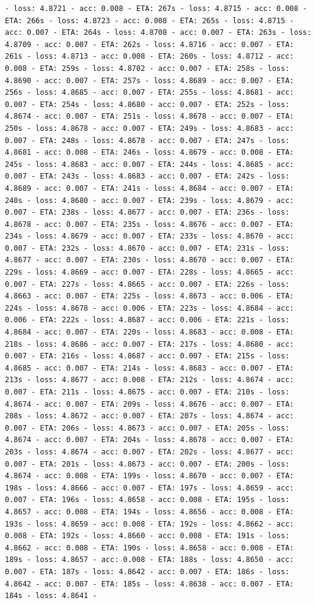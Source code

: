\documentclass[11pt]{article}
\begin{document}
\begin{Verbatim}[commandchars=\\\{\}]
- loss: 4.8721 - acc: 0.008 - ETA: 267s - loss: 4.8715 - acc: 0.008 - ETA: 266s - loss: 4.8723 - acc: 0.008 - ETA: 265s - loss: 4.8715 - acc: 0.007 - ETA: 264s - loss: 4.8708 - acc: 0.007 - ETA: 263s - loss: 4.8709 - acc: 0.007 - ETA: 262s - loss: 4.8716 - acc: 0.007 - ETA: 261s - loss: 4.8713 - acc: 0.008 - ETA: 260s - loss: 4.8712 - acc: 0.008 - ETA: 259s - loss: 4.8702 - acc: 0.007 - ETA: 258s - loss: 4.8690 - acc: 0.007 - ETA: 257s - loss: 4.8689 - acc: 0.007 - ETA: 256s - loss: 4.8685 - acc: 0.007 - ETA: 255s - loss: 4.8681 - acc: 0.007 - ETA: 254s - loss: 4.8680 - acc: 0.007 - ETA: 252s - loss: 4.8674 - acc: 0.007 - ETA: 251s - loss: 4.8678 - acc: 0.007 - ETA: 250s - loss: 4.8678 - acc: 0.007 - ETA: 249s - loss: 4.8683 - acc: 0.007 - ETA: 248s - loss: 4.8678 - acc: 0.007 - ETA: 247s - loss: 4.8681 - acc: 0.008 - ETA: 246s - loss: 4.8679 - acc: 0.008 - ETA: 245s - loss: 4.8683 - acc: 0.007 - ETA: 244s - loss: 4.8685 - acc: 0.007 - ETA: 243s - loss: 4.8683 - acc: 0.007 - ETA: 242s - loss: 4.8689 - acc: 0.007 - ETA: 241s - loss: 4.8684 - acc: 0.007 - ETA: 240s - loss: 4.8680 - acc: 0.007 - ETA: 239s - loss: 4.8679 - acc: 0.007 - ETA: 238s - loss: 4.8677 - acc: 0.007 - ETA: 236s - loss: 4.8678 - acc: 0.007 - ETA: 235s - loss: 4.8676 - acc: 0.007 - ETA: 234s - loss: 4.8679 - acc: 0.007 - ETA: 233s - loss: 4.8670 - acc: 0.007 - ETA: 232s - loss: 4.8670 - acc: 0.007 - ETA: 231s - loss: 4.8677 - acc: 0.007 - ETA: 230s - loss: 4.8670 - acc: 0.007 - ETA: 229s - loss: 4.8669 - acc: 0.007 - ETA: 228s - loss: 4.8665 - acc: 0.007 - ETA: 227s - loss: 4.8665 - acc: 0.007 - ETA: 226s - loss: 4.8663 - acc: 0.007 - ETA: 225s - loss: 4.8673 - acc: 0.006 - ETA: 224s - loss: 4.8678 - acc: 0.006 - ETA: 223s - loss: 4.8684 - acc: 0.006 - ETA: 222s - loss: 4.8687 - acc: 0.006 - ETA: 221s - loss: 4.8684 - acc: 0.007 - ETA: 220s - loss: 4.8683 - acc: 0.008 - ETA: 218s - loss: 4.8686 - acc: 0.007 - ETA: 217s - loss: 4.8680 - acc: 0.007 - ETA: 216s - loss: 4.8687 - acc: 0.007 - ETA: 215s - loss: 4.8685 - acc: 0.007 - ETA: 214s - loss: 4.8683 - acc: 0.007 - ETA: 213s - loss: 4.8677 - acc: 0.008 - ETA: 212s - loss: 4.8674 - acc: 0.007 - ETA: 211s - loss: 4.8675 - acc: 0.007 - ETA: 210s - loss: 4.8674 - acc: 0.007 - ETA: 209s - loss: 4.8676 - acc: 0.007 - ETA: 208s - loss: 4.8672 - acc: 0.007 - ETA: 207s - loss: 4.8674 - acc: 0.007 - ETA: 206s - loss: 4.8673 - acc: 0.007 - ETA: 205s - loss: 4.8674 - acc: 0.007 - ETA: 204s - loss: 4.8678 - acc: 0.007 - ETA: 203s - loss: 4.8674 - acc: 0.007 - ETA: 202s - loss: 4.8677 - acc: 0.007 - ETA: 201s - loss: 4.8673 - acc: 0.007 - ETA: 200s - loss: 4.8674 - acc: 0.008 - ETA: 199s - loss: 4.8670 - acc: 0.007 - ETA: 198s - loss: 4.8666 - acc: 0.007 - ETA: 197s - loss: 4.8659 - acc: 0.007 - ETA: 196s - loss: 4.8658 - acc: 0.008 - ETA: 195s - loss: 4.8657 - acc: 0.008 - ETA: 194s - loss: 4.8656 - acc: 0.008 - ETA: 193s - loss: 4.8659 - acc: 0.008 - ETA: 192s - loss: 4.8662 - acc: 0.008 - ETA: 192s - loss: 4.8660 - acc: 0.008 - ETA: 191s - loss: 4.8662 - acc: 0.008 - ETA: 190s - loss: 4.8658 - acc: 0.008 - ETA: 189s - loss: 4.8657 - acc: 0.008 - ETA: 188s - loss: 4.8650 - acc: 0.007 - ETA: 187s - loss: 4.8642 - acc: 0.007 - ETA: 186s - loss: 4.8642 - acc: 0.007 - ETA: 185s - loss: 4.8638 - acc: 0.007 - ETA: 184s - loss: 4.8641 - 
\end{Verbatim}
\end{document}
